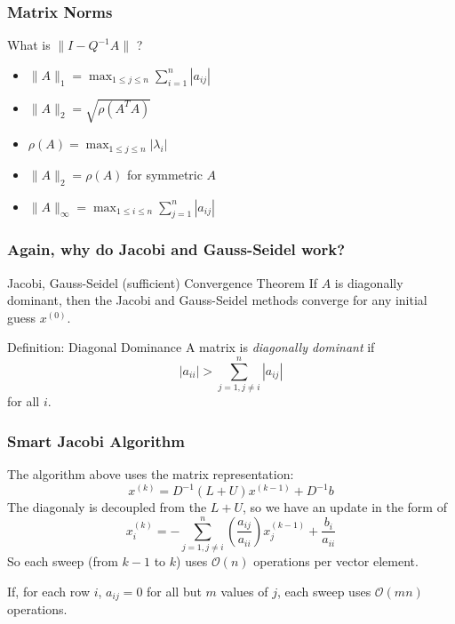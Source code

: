 \documentclass[10pt]{beamer}
\newcommand{\mO}{{\mathcal{O}}}
\begin{document}
\begin{frame}
\frametitle{Matrix Norms}
What is $\|I - Q^{-1}A\|$ ?
\begin{itemize}
	\item $\|A\|_{1} = \max_{1\leq j \leq n} \sum_{i=1}^{n} |a_{ij}|$
	\item $\|A\|_{2} = \sqrt{\rho(A^{T}A)}$
	\item $\rho(A) = \max_{1\leq j \leq n} |\lambda_{i}|$
	\item $\|A\|_{2} = \rho(A)$ for symmetric $A$
	\item $\|A\|_{\infty} = \max_{1\leq i \leq n} \sum_{j=1}^{n} |a_{ij}|$
\end{itemize}
\end{frame}
\begin{frame}
\frametitle{Again, why do Jacobi and Gauss-Seidel work?}
\begin{block}{Jacobi, Gauss-Seidel (sufficient) Convergence Theorem}
	If $A$ is diagonally dominant, then the Jacobi and Gauss-Seidel methods converge for any initial guess $x^{(0)}$.
\end{block}
\bigskip

\begin{block}{Definition: Diagonal Dominance}
A matrix is \emph{diagonally dominant} if
\begin{equation*}
	|a_{ii}| > \sum_{j=1,j\ne i}^{n} |a_{ij}|
\end{equation*}
for all $i$.
\end{block}
\end{frame}
\begin{frame}
\frametitle{Smart Jacobi Algorithm}
The algorithm above uses the matrix representation:
\begin{equation*}
x^{(k)} = D^{-1}(L+U) x^{(k-1)} + D^{-1}b
\end{equation*}
The diagonaly is decoupled from the $L+U$, so we have an update in the form of
\begin{equation*}
x_{i}^{(k)} = -\sum_{j=1,j\ne i}^{n} \left(\frac{a_{ij}}{a_{ii}}\right) x_{j}^{(k-1)} + \frac{b_{i}}{a_{ii}}
\end{equation*} 
So each sweep (from $k-1$ to $k$) uses $\mO(n)$ operations per vector element.

If, for each row $i$, $a_{ij} = 0$ for all but $m$ values of $j$, each sweep 
uses $\mO(mn)$ operations.
\end{frame}
\end{document}
